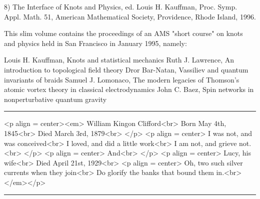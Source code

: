 8) The Interface of Knots and Physics, ed. Louis H. Kauffman, Proc.
Symp. Appl. Math. 51, American Mathematical Society, Providence, Rhode
Island, 1996.  

This slim volume contains the proceedings of an AMS "short course" on
knots and physics held in San Francisco in January 1995, namely:

Louis H. Kauffman, Knots and statistical mechanics
Ruth J. Lawrence, An introduction to topological field theory
Dror Bar-Natan, Vassiliev and quantum invariants of braids
Samuel J. Lomonaco, The modern legacies of Thomson's atomic vortex
                    theory in classical electrodynamics
John C. Baez, Spin networks in nonperturbative quantum gravity

\par\noindent\rule{\textwidth}{0.4pt}
<p align = center><em>
William Kingon Clifford<br>
Born May 4th, 1845<br>
Died March 3rd, 1879<br>
</p>
<p align = center>
I was not, and was conceived<br>
I loved, and did a little work<br>
I am not, and grieve not.<br>
</p>
<p align = center>
And<br>
</p>
<p align = center>
Lucy, his wife<br>
Died April 21st, 1929<br>
<p align = center>
Oh, two such silver currents when they join<br>
Do glorify the banks that bound them in.<br>
</em></p>


\par\noindent\rule{\textwidth}{0.4pt}

